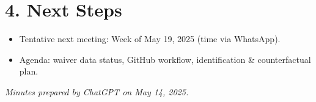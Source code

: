 \documentclass[11pt]{article}
\begin{document}
\section*{4. Next Steps}
\begin{itemize}
    \item Tentative next meeting: Week of May 19, 2025 (time via WhatsApp).
    \item Agenda: waiver data status, GitHub workflow, identification \& counterfactual plan.
\end{itemize}

\bigskip
\noindent\textit{Minutes prepared by ChatGPT on May 14, 2025.}




\end{document}
